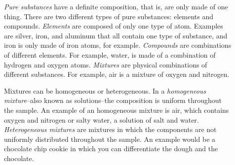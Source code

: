 \documentclass[main.tex]{subfiles}
\begin{document}
\begin{description}
\item[] \emph{Pure substances} have a definite composition, that is, are only made of one thing. There are two different types of pure substances: elements and compounds. \emph{Elements} are composed of only one type of atom. Examples are silver, iron, and aluminum that all contain one type of substance, and iron is only made of iron atoms, for example. \emph{Compounds} are combinations of different elements. For example, water,  is made of a combination of hydrogen and oxygen atoms. \emph{Mixtures} are physical combinations of different substances. For example, air is a mixture of oxygen and nitrogen. 
\item[]Mixtures can be homogeneous or heterogeneous. In a \emph{homogeneous mixture}--also known as solutions--the composition is uniform throughout the sample. An example of an homogeneous mixture is air, which contains oxygen and nitrogen or salty water, a solution of salt and water. \emph{Heterogeneous mixtures} are mixtures in which the components are not uniformly distributed throughout the sample. An example would be a chocolate chip cookie in which you can differentiate the dough and the chocolate.





\end{description}
\end{document}
